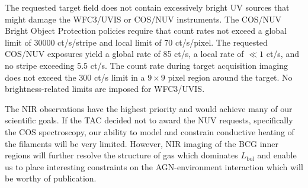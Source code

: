 \documentclass[12pt]{article}
\begin{document}
The requested target field does not contain excessively bright UV
sources that might damage the WFC3/UVIS or COS/NUV instruments. The
COS/NUV Bright Object Protection policies require that count rates not
exceed a global limit of 30000 ct/s/stripe and local limit of 70
ct/s/pixel. The requested COS/NUV exposures yield a global rate of 85
ct/s, a local rate of $\ll 1$ ct/s, and no stripe exceeding 5.5
ct/s. The count rate during target acquisition imaging does not exceed
the 300 ct/s limit in a $9 \times 9$ pixel region around the
target. No brightness-related limits are imposed for WFC3/UVIS.

The NIR observations have the highest priority and would achieve many
of our scientific goals. If the TAC decided not to award the NUV
requests, specifically the COS spectroscopy, our ability to model and
constrain conductive heating of the filaments will be very
limited. However, NIR imaging of the BCG inner regions will further
resolve the structure of gas which dominates $L_{\mathrm{bol}}$ and
enable us to place interesting constraints on the AGN-environment
interaction which will be worthy of publication.

\specialreq

\coordinatedobs

\duplications

\pasthstusage
\end{document}
